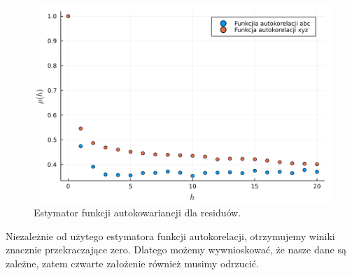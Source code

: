 \documentclass[12pt,leqno]{article}
\theoremstyle{exer}
\begin{document}
	\begin{figure}[H]
		\centering
		\includegraphics[width=4\columnwidth/5]{images/Budnik/corr.png}
		\caption{Estymator funkcji autokowariancji dla residuów.}
	\end{figure}
	Niezależnie od użytego estymatora funkcji autokorelacji, otrzymujemy winiki znacznie przekraczające zero. Dlatego możemy wywnioskować, że nasze dane są zależne, zatem czwarte założenie również musimy odrzucić.
	
	
	
	
\end{document}
